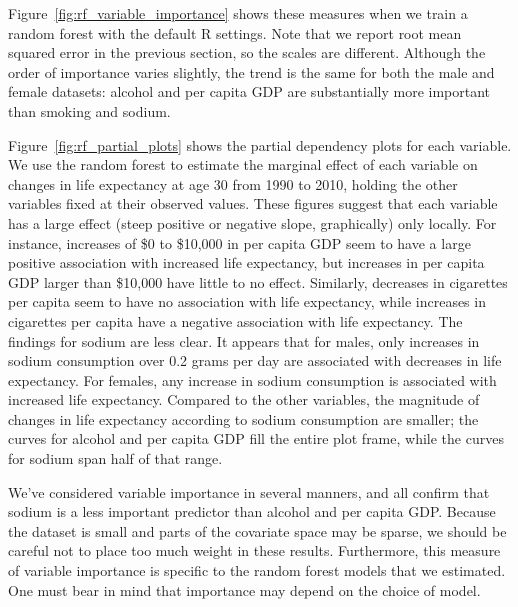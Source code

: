 \documentclass[11pt]{article}\usepackage[]{graphicx}\usepackage[]{color}
\begin{document}
Figure~\ref{fig:rf_variable_importance} shows these measures when we train a random forest with the default R settings.
Note that we report root mean squared error in the previous section, so the scales are different.
Although the order of importance varies slightly, the trend is the same for both the male and female datasets: alcohol and per capita GDP are substantially more important than smoking and sodium.

Figure~\ref{fig:rf_partial_plots} shows the partial dependency plots for each variable.
We use the random forest to estimate the marginal effect of each variable on changes in life expectancy at age 30 from 1990 to 2010, holding the other variables fixed at their observed values.
These figures suggest that each variable has a large effect (steep positive or negative slope, graphically) only locally.
For instance, increases of \$0 to \$10,000 in per capita GDP seem to have a large positive association with increased life expectancy, but increases in per capita GDP larger than \$10,000 have little to no effect.
Similarly, decreases in cigarettes per capita seem to have no association with life expectancy, while increases in cigarettes per capita have a negative association with life expectancy.
The findings for sodium are less clear.
It appears that for males, only increases in sodium consumption over 0.2 grams per day are associated with decreases in life expectancy.
For females, any increase in sodium consumption is associated with increased life expectancy.
Compared to the other variables, the magnitude of changes in life expectancy according to sodium consumption are smaller; the curves for alcohol and per capita GDP fill the entire plot frame, while the curves for sodium span half of that range.

We've considered variable importance in several manners, and all confirm that sodium is a less important predictor than alcohol and per capita GDP.
Because the dataset is small and parts of the covariate space may be sparse, we should be careful not to place too much weight in these results.
Furthermore, this measure of variable importance is specific to the random forest models that we estimated.
One must bear in mind that importance may depend on the choice of model.
\end{document}
